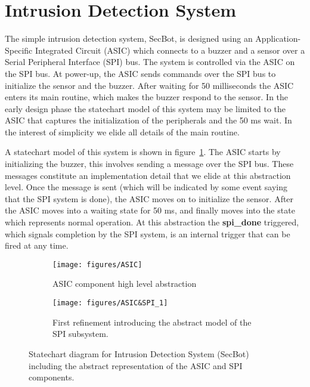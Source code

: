

\section{Intrusion Detection System}
\label{sec:secbot}


The simple intrusion detection system, SecBot, is designed using an Application-Specific Integrated Circuit (ASIC) which connects to a buzzer and a sensor over a Serial Peripheral Interface (SPI) bus. The system is controlled via the ASIC on the SPI bus. At power-up, the ASIC sends commands over the SPI bus to initialize the sensor and the buzzer. After waiting for 50 milliseconds the ASIC enters its main routine, which makes the buzzer respond to the sensor. In the early design phase the statechart model of this system may be limited to the ASIC that captures the initialization of the peripherals and the 50 ms wait. In the interest of simplicity we elide all details of the main routine.

A statechart model of this system is shown in figure~\ref{fig:ASIC}. The ASIC starts by initializing the buzzer, this involves sending a message over the SPI bus. These messages constitute an implementation detail that we elide at this abstraction level. Once the message is sent (which will be indicated by some event saying that the SPI system is done), the ASIC moves on to initialize the sensor. After the ASIC moves into a waiting state for 50 ms, and finally moves into the state which represents normal operation. At this abstraction the \textbf{spi\_done} triggered, which signals completion by the SPI system, is an internal trigger that can be fired at any time.

\begin{figure*}[t!]
	    \begin{subfigure}[t]{0.5\textwidth}
	        \begin{centering}
	        \texttt{[image: figures/ASIC]}
	        \caption{ASIC component high level abstraction}
	        \label{fig:ASIC}
	        \end{centering}
	    \end{subfigure}
\qquad
	    \begin{subfigure}[t]{0.5\textwidth}
	        \texttt{[image: figures/ASIC\&SPI\_1]}
	        \caption{First refinement introducing the abstract model of the SPI subsystem.}
	        \label{fig:ASIC_SPI_1}
	    \end{subfigure}
	    \caption{Statechart diagram for Intrusion Detection System (SecBot) including the abstract representation of the ASIC and SPI components.}
\end{figure*}

